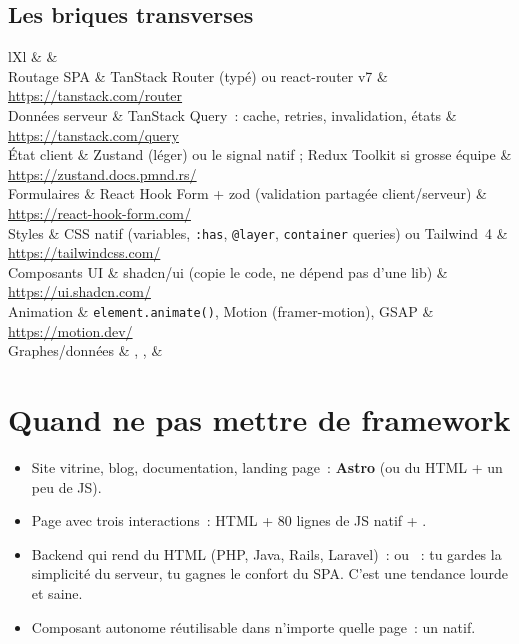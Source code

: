 \subsection{Les briques transverses}

\begin{tabz}{lXl}
  \headrow {} \&  \&  \\
  \midrule
  Routage SPA \& TanStack Router (typ\'e) ou react-router v7 \& \url{https://tanstack.com/router} \\
  Donn\'ees serveur \& TanStack Query~: cache, retries, invalidation, \'etats \& \url{https://tanstack.com/query} \\
  \'Etat client \& Zustand (l\'eger) ou le signal natif ; Redux Toolkit si grosse \'equipe \& \url{https://zustand.docs.pmnd.rs/} \\
  Formulaires \& React Hook Form + zod (validation partag\'ee client/serveur) \& \url{https://react-hook-form.com/} \\
  Styles \& CSS natif (variables, \verb|:has|, \verb|@layer|, \verb|container| queries) ou Tailwind~4 \& \url{https://tailwindcss.com/} \\
  Composants UI \& shadcn/ui (copie le code, ne d\'epend pas d'une lib) \& \url{https://ui.shadcn.com/} \\
  Animation \& \verb|element.animate()|, Motion (framer-motion), GSAP \& \url{https://motion.dev/} \\
  Graphes/donn\'ees \& , ,  \& \\
\end{tabz}

\section{Quand ne pas mettre de framework}

\begin{itemize}
  \item Site vitrine, blog, documentation, landing page~: \textbf{Astro} (ou du HTML + un peu de JS).
  \item Page avec trois interactions~: HTML + 80 lignes de JS natif + .
  \item Backend qui rend du HTML (PHP, Java, Rails, Laravel)~: 
        ou ~: tu gardes la simplicit\'e du serveur,
        tu gagnes le confort du SPA. C'est une tendance lourde et saine.
  \item Composant autonome r\'eutilisable dans n'importe quelle page~: un
         natif.
\end{itemize}

